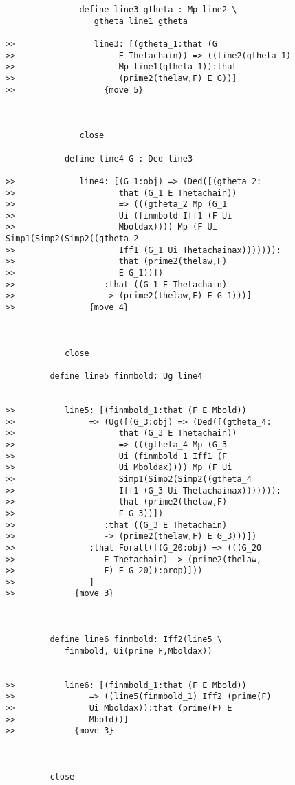 \documentclass[12pt]{article}
\begin{document}
\begin{verbatim}
               define line3 gtheta : Mp line2 \
                  gtheta line1 gtheta

>>                line3: [(gtheta_1:that (G
>>                     E Thetachain)) => ((line2(gtheta_1)
>>                     Mp line1(gtheta_1)):that
>>                     (prime2(thelaw,F) E G))]
>>                  {move 5}



               close

            define line4 G : Ded line3

>>             line4: [(G_1:obj) => (Ded([(gtheta_2:
>>                     that (G_1 E Thetachain))
>>                     => (((gtheta_2 Mp (G_1
>>                     Ui (finmbold Iff1 (F Ui
>>                     Mboldax)))) Mp (F Ui Simp1(Simp2(Simp2((gtheta_2
>>                     Iff1 (G_1 Ui Thetachainax))))))):
>>                     that (prime2(thelaw,F)
>>                     E G_1))])
>>                  :that ((G_1 E Thetachain)
>>                  -> (prime2(thelaw,F) E G_1)))]
>>               {move 4}



            close

         define line5 finmbold: Ug line4


>>          line5: [(finmbold_1:that (F E Mbold))
>>               => (Ug([(G_3:obj) => (Ded([(gtheta_4:
>>                     that (G_3 E Thetachain))
>>                     => (((gtheta_4 Mp (G_3
>>                     Ui (finmbold_1 Iff1 (F
>>                     Ui Mboldax)))) Mp (F Ui
>>                     Simp1(Simp2(Simp2((gtheta_4
>>                     Iff1 (G_3 Ui Thetachainax))))))):
>>                     that (prime2(thelaw,F)
>>                     E G_3))])
>>                  :that ((G_3 E Thetachain)
>>                  -> (prime2(thelaw,F) E G_3)))])
>>               :that Forall([(G_20:obj) => (((G_20
>>                  E Thetachain) -> (prime2(thelaw,
>>                  F) E G_20)):prop)]))
>>               ]
>>            {move 3}



         define line6 finmbold: Iff2(line5 \
            finmbold, Ui(prime F,Mboldax))


>>          line6: [(finmbold_1:that (F E Mbold))
>>               => ((line5(finmbold_1) Iff2 (prime(F)
>>               Ui Mboldax)):that (prime(F) E
>>               Mbold))]
>>            {move 3}



         close


\end{verbatim}
\end{document}
